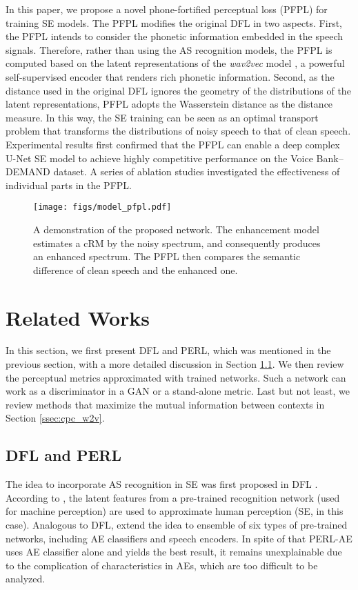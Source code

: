 \documentclass[a4paper]{article}
\begin{document}
In this paper, we propose a novel phone-fortified perceptual loss (PFPL) for training SE models. The PFPL modifies the original DFL in two aspects. First, the PFPL intends to consider the phonetic information embedded in the speech signals. Therefore, rather than using the AS recognition models, the PFPL is computed based on the latent representations of the \textit{wav2vec}
 model \cite{schneider2019wav2vec}, a powerful self-supervised encoder that renders rich phonetic information.  Second, as the distance used in the original DFL ignores the geometry of the distributions of the latent representations, PFPL adopts the Wasserstein distance \cite{OLKIN1982257}
as the distance measure. In this way, the SE training can be seen as an optimal transport problem that transforms the distributions of noisy speech to that of clean speech.
Experimental results first confirmed that the PFPL can enable a deep complex U-Net SE model to achieve highly competitive performance on the Voice Bank--DEMAND dataset. A series of ablation studies investigated the effectiveness of individual parts in the PFPL.
\begin{figure*}[t]
    \centering
    \texttt{[image: figs/model\_pfpl.pdf]}
\caption{A demonstration of the proposed network. The enhancement model estimates a cRM by the noisy spectrum, and consequently produces an enhanced spectrum. The PFPL then compares the semantic difference of clean speech and the enhanced one.}
    \label{fig:model}
\end{figure*}

\section{Related Works}

\label{sec:relatedworks}
In this section, we first present DFL and PERL, which was mentioned in the previous section, with a more detailed discussion in Section \ref{ssec:dfl}. We then review the perceptual metrics approximated with trained networks. Such a network can work as a discriminator in a GAN or a stand-alone metric. Last but not least, we review methods that maximize the mutual information between contexts in Section \ref{ssec:cpc_w2v}. 

\subsection{DFL and PERL}
\label{ssec:dfl}
The idea to incorporate AS recognition in SE was first proposed in DFL \cite{germain2019speech}. According to \cite{su2020hifi}, the latent features from a pre-trained recognition network (used for machine perception) are used to approximate human perception (SE, in this case). Analogous to DFL, \cite{kataria2020perceptual} extend the idea to ensemble of six types of pre-trained networks, including AE classifiers and speech encoders. In spite of that PERL-AE uses AE classifier alone and yields the best result, it remains unexplainable due to the complication of characteristics in AEs, which are too difficult to be analyzed.
\end{document}
